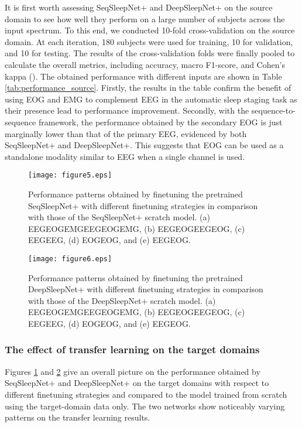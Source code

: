\documentclass[journal,twoside,web]{ieeecolor}
\begin{document}
It is first worth assessing SeqSleepNet+ and DeepSleepNet+ on the source domain to see how well they perform on a large number of subjects across the input spectrum. 
To this end, we conducted 10-fold cross-validation on the source domain. At each iteration, 180 subjects were used for training, 10 for validation, and 10 for testing. The results of the cross-validation folds were finally pooled to calculate the overall metrics, including accuracy, macro F1-score, and Cohen's kappa (). The obtained performance with different inputs are shown in Table \ref{tab:performance_source}. Firstly, the results in the table confirm the benefit of using EOG and EMG to complement EEG in the automatic sleep staging task as their presence lead to performance improvement. Secondly, with the sequence-to-sequence framework, the performance obtained by the secondary EOG is just marginally lower than that of the primary EEG, evidenced by both SeqSleepNet+ and DeepSleepNet+. This suggests that EOG can be used as a standalone modality similar to EEG when a single channel is used. 

\begin{figure} [!t]
	\centering
	\texttt{[image: figure5.eps]}
\caption{Performance patterns obtained by finetuning the pretrained SeqSleepNet+ with different finetuning strategies in comparison with those of the SeqSleepNet+ scratch model. (a) EEGEOGEMGEEGEOGEMG, (b) EEGEOGEEGEOG, (c) EEGEEG, (d) EOGEOG, and (e) EEGEOG.}
	\label{fig:seqsleepnet_finetune}
	\vspace{-0.35cm}
\end{figure}

\begin{figure} [!t]
	\centering
	\texttt{[image: figure6.eps]}
\caption{Performance patterns obtained by finetuning the pretrained DeepSleepNet+ with different finetuning strategies in comparison with those of the DeepSleepNet+ scratch model. (a) EEGEOGEMGEEGEOGEMG, (b) EEGEOGEEGEOG, (c) EEGEEG, (d) EOGEOG, and (e) EEGEOG.}
	\label{fig:deepsleepnet_finetune}
	\vspace{-0.35cm}
\end{figure}

\subsubsection{The effect of transfer learning on the target domains}
\label{sssec:transfer_learning_effects}
Figures \ref{fig:seqsleepnet_finetune} and \ref{fig:deepsleepnet_finetune} give an overall picture on the performance obtained by SeqSleepNet+ and DeepSleepNet+ on the target domains with respect to different finetuning strategies and compared to the model trained from scratch using the target-domain data only.
The two networks show noticeably varying patterns on the transfer learning results. 
\end{document}
